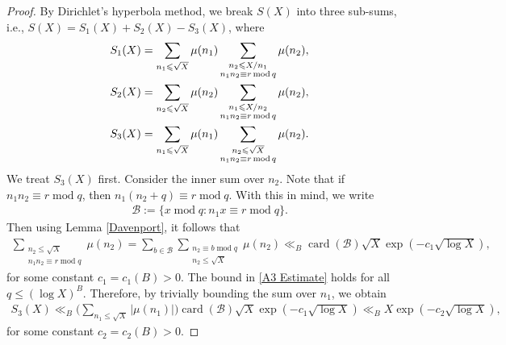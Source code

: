 \documentclass[11pt]{amsart}
\numberwithin{equation}{section}
\numberwithin{figure}{section}
\theoremstyle{definition}
\newcommand{\modu}{\operatorname{mod}}
\begin{document}
\begin{proof}
By Dirichlet's hyperbola method, we break $S(X)$ into three sub-sums, i.e., $S(X) = S_1(X)+S_2(X) - S_3(X)$, where
\begin{align}
\notag S_1(X) &= \sum_{n_1 \leqslant \sqrt{X}} \mu(n_1) \sum_{\substack{n_2 \leqslant X/n_1 \\ n_1 n_2 \equiv r \modu q}} \mu(n_2),\\
\notag  S_2(X) &= \sum_{n_2 \leqslant \sqrt{X}} \mu(n_2) \sum_{\substack{n_1 \leqslant X/n_2 \\ n_1 n_2 \equiv r \modu q}} \mu(n_2),\\
\notag S_3(X) &= \sum_{n_1 \leqslant \sqrt{X}} \mu(n_1) \notag \sum_{\substack{n_2 \leqslant \sqrt{X} \\ n_1 n_2 \equiv r \modu q}} \mu(n_2).
\end{align}
We treat $S_3(X)$ first. Consider the inner sum over $n_2$.  Note that if $n_1 n_2 \equiv r \modu q$, then $n_1(n_2 + q) \equiv r \modu q$. With this in mind, we write 
\begin{align}\label{Def : B}
\mathcal{B}:=\big\{x\modu q\colon n_1x \equiv r \modu q\big\}.
\end{align}
Then using Lemma \ref{Davenport}, it follows that
\begin{align}\label{A3 Estimate}
\sum_{\substack{n_2 \leqslant \sqrt{X} \\ n_1 n_2 \equiv r \modu q}} \mu(n_2) = \sum_{b \in \mathcal{B}} \sum_{\substack{n_2 \equiv b \modu q \\ n_2 \leqslant \sqrt{X}}} \mu(n_2) \ll_B \operatorname{card}(\mathcal{B}) \sqrt{X} \exp(-c_1 \sqrt{\log X}),
\end{align}
for some constant $c_1=c_1(B)>0$. The bound in \eqref{A3 Estimate} holds for all $q \leqslant (\log X)^B$. Therefore, by trivially bounding the sum over $n_1$, we obtain
\begin{align}\label{A3 Estimate Final}
S_3(X) \ll_B \bigg(\sum_{n_1 \leqslant \sqrt{X}} |\mu(n_1)|\bigg) \operatorname{card}(\mathcal{B}) \sqrt{X} \exp(-c_1 \sqrt{\log X}) \ll_B X \exp(-c_2 \sqrt{\log X}),
\end{align}
for some constant $c_2=c_2(B)>0$.


\end{proof}
\end{document}
